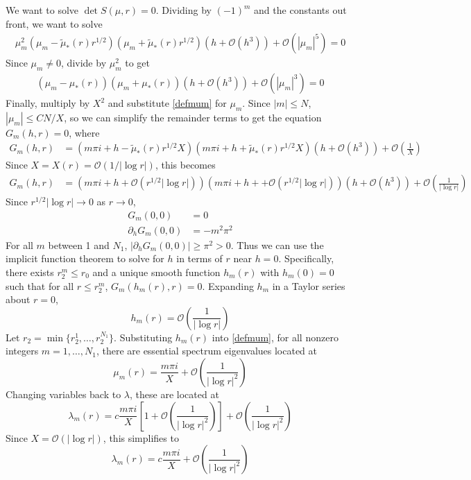 \documentclass[thesis.tex]{subfiles}
\begin{document}
We want to solve $\det S(\mu, r) = 0$. Dividing by $(-1)^m$ and the constants out front, we want to solve 
\begin{equation}\label{Bess2}
\begin{aligned}
\mu_m^2 (\mu_m - \tilde{\mu}_*(r)r^{1/2})(\mu_m + \tilde{\mu}_*(r)r^{1/2}) \left( h + \mathcal{O}(h^3) \right) + \mathcal{O}\left( |\mu_m|^5 \right) = 0
\end{aligned}
\end{equation}
Since $\mu_m \neq 0$, divide by $\mu_m^2$ to get
\begin{equation}\label{Bess3}
\begin{aligned}
(\mu_m - \mu_*(r))(\mu_m + \mu_*(r)) \left( h + \mathcal{O}(h^3) \right) + \mathcal{O}\left( |\mu_m|^3 \right) = 0
\end{aligned}
\end{equation}
Finally, multiply by $X^2$ and substitute \cref{defmum} for $\mu_m$. Since $|m| \leq N$, $|\mu_m| \leq C N/X$, so we can simplify the remainder terms to get the equation $G_m(h, r) = 0$, where
\begin{equation}\label{Bess4}
\begin{aligned}
G_m(h, r) &= \left(m \pi i + h - \tilde{\mu}_*(r) r^{1/2} X\right)\left(m \pi i + h + \tilde{\mu}_*(r) r^{1/2} X \right) \left( h + \mathcal{O}(h^3) \right) + \mathcal{O}\left( \frac{1}{X} \right)
\end{aligned}
\end{equation}
Since $X = X(r) = \mathcal{O}(1/|\log r|)$, this becomes
\begin{equation}\label{Bess4}
\begin{aligned}
G_m(h, r) &= \left( m \pi i + h + \mathcal{O}(r^{1/2}|\log r|) \right)\left(m \pi i + h + + \mathcal{O}(r^{1/2}|\log r|) \right) \left( h + \mathcal{O}(h^3) \right) + \mathcal{O}\left( \frac{1}{|\log r|} \right)
\end{aligned}
\end{equation}
Since $r^{1/2}|\log r| \rightarrow 0$ as $r \rightarrow 0$,
\begin{align*}
G_m(0,0) &= 0 \\
\partial_h G_m(0,0) &= -m^2 \pi^2
\end{align*}
For all $m$ between 1 and $N_1$, $|\partial_h G_m(0,0)| \geq \pi^2 > 0$. Thus we can use the implicit function theorem to solve for $h$ in terms of $r$ near $h = 0$. Specifically, there exists $r_2^m \leq r_0$ and a unique smooth function $h_m(r)$ with $h_m(0) = 0$ such that for all $r \leq r_2^m$, $G_m(h_m(r),r) = 0$. Expanding $h_m$ in a Taylor series about $r = 0$,
\[
h_m(r) = \mathcal{O}\left( \frac{1}{|\log r|} \right)
\]
Let $r_2 = \min\{ r_2^1, \dots, r_2^{N_1} \}$. Substituting $h_m(r)$ into \cref{defmum}, for all nonzero integers $m = 1, \dots, N_1$, there are essential spectrum eigenvalues located at
\[
\mu_m(r) = \frac{m \pi i}{X} + \mathcal{O}\left( \frac{1}{|\log r|^2} \right)
\]
Changing variables back to $\lambda$, these are located at
\[
\lambda_m(r) = c \frac{m \pi i}{X}\left[1 + \mathcal{O}\left( \frac{1}{|\log r|^2} \right) \right] +\mathcal{O}\left( \frac{1}{|\log r|^2} \right)
\]
Since $X = \mathcal{O}(|\log r|)$, this simplifies to
\[
\lambda_m(r) = c \frac{m \pi i}{X} +\mathcal{O}\left( \frac{1}{|\log r|^2} \right)
\]
\end{document}
